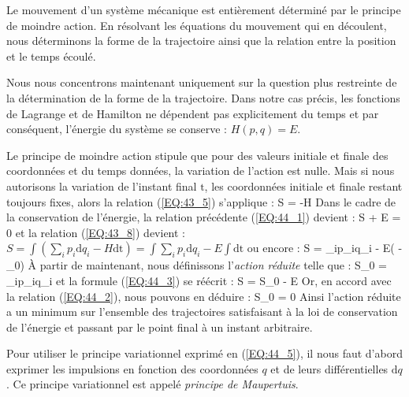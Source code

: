 Le mouvement d'un syst\`{e}me m\'{e}canique est enti\`{e}rement d\'{e}termin\'{e} par le principe de moindre action. En r\'{e}solvant les \'{e}quations du mouvement qui en d\'{e}coulent, nous d\'{e}terminons la forme de la trajectoire ainsi que la relation entre la position et le temps \'{e}coul\'{e}.

Nous nous concentrons maintenant uniquement sur la question plus restreinte de la d\'{e}termination de la forme de la trajectoire. Dans notre cas pr\'{e}cis, les fonctions de Lagrange et de Hamilton ne d\'{e}pendent pas explicitement du temps et par cons\'{e}quent, l'\'{e}nergie du syst\`{e}me se conserve : $H(p,q) = E$.

Le principe de moindre action stipule que pour des valeurs initiale et finale des coordonn\'{e}es et du temps donn\'{e}es, la variation de l'action est nulle. Mais si nous autorisons la variation de l'instant final $\mathrm{t}$, les coordonn\'{e}es initiale et finale restant toujours fixes, alors la relation (\ref{EQ:43_5}) s'applique :
\be
	\delta S = -H\delta{} \label{EQ:44_1}
\ee
Dans le cadre de la conservation de l'\'{e}nergie, la relation pr\'{e}c\'{e}dente (\ref{EQ:44_1}) devient :
\be
	\delta S + E\delta{} = 0 \label{EQ:44_2}
\ee
et la relation (\ref{EQ:43_8}) devient : $S = \int(\sum_{i}p_{i}\mathrm{d}q_{i} - H\mathrm{dt}) = \int\sum_{i}p_{i}\mathrm{d}q_{i} - E\int\mathrm{dt}$ ou encore :
\be
	S = \int\sum_{i}p_{i}q_{i} - E( - _{0}) \label{EQ:44_3}
\ee
\`{A} partir de maintenant, nous d\'{e}finissons l'\emph{action r\'{e}duite} telle que :
\be
	S_{0} = \int\sum_{i}p_{i}q_{i} \label{EQ:44_4}
\ee
et la formule (\ref{EQ:44_3}) se r\'{e}\'{e}crit :
\benn
	\delta S = \delta S_{0} - E\delta{}
\eenn
Or, en accord avec la relation (\ref{EQ:44_2}), nous pouvons en d\'{e}duire :
\be
	\delta S_{0} = 0 \label{EQ:44_5}
\ee
Ainsi l'action r\'{e}duite a un minimum sur l'ensemble des trajectoires satisfaisant \`{a} la loi de conservation de l'\'{e}nergie et passant par le point final \`{a} un instant arbitraire.

Pour utiliser le principe variationnel exprim\'{e} en (\ref{EQ:44_5}), il nous faut d'abord exprimer les impulsions en fonction des coordonn\'{e}es $q$ et de leurs diff\'{e}rentielles $\mathrm{d}q$. Ce principe variationnel est appel\'{e} \emph{principe de Maupertuis}.

